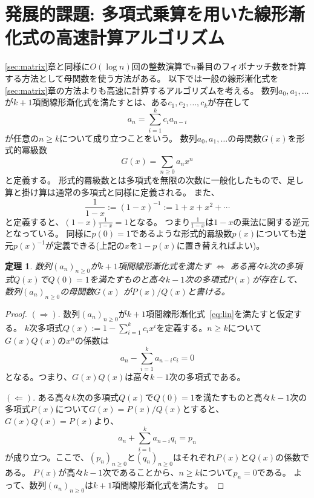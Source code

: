 \documentclass[a4paper,twoside,onecolumn,openany,article]{memoir}
\theoremstyle{plain}
\newtheorem{theorem}{定理}
\theoremstyle{remark}
\begin{document}
\section{発展的課題: 多項式乗算を用いた線形漸化式の高速計算アルゴリズム}
\ref{sec:matrix}章と同様に$O(\log n)$回の整数演算で$n$番目のフィボナッチ数を計算する方法として母関数を使う方法がある。
以下では一般の線形漸化式を\ref{sec:matrix}章の方法よりも高速に計算するアルゴリズムを考える。
数列$a_0,a_1,\dotsc$が$k+1$項間線形漸化式を満たすとは、ある$c_1,c_2,\dotsc,c_k$が存在して
\begin{equation}
a_n = \sum_{i=1}^k c_i a_{n-i}
\label{eq:lin}
\end{equation}
が任意の$n\ge k$について成り立つことをいう。
数列$a_0,a_1,\dotsc$の母関数$G(x)$を形式的冪級数
\begin{equation*}
G(x)=\sum_{n\ge 0} a_n x^n
\end{equation*}
と定義する。
形式的羃級数とは多項式を無限の次数に一般化したもので、足し算と掛け算は通常の多項式と同様に定義される。
また、
\begin{equation*}
\frac1{1-x} := (1-x)^{-1} := 1+x+x^2+\dotsb
\end{equation*}
と定義すると、$(1-x) \frac1{1-x} = 1$となる。
つまり$\frac1{1-x}$は$1-x$の乗法に関する逆元となっている。
同様に$p(0)= 1$であるような形式的羃級数$p(x)$についても逆元$p(x)^{-1}$が定義できる(上記の$x$を$1-p(x)$に置き替えればよい)。
\begin{theorem}\label{thm:lin}
数列$(a_n)_{n\ge 0}$が$k+1$項間線形漸化式を満たす $\iff$ ある高々$k$次の多項式$Q(x)$で$Q(0)=1$を満たすものと高々$k-1$次の多項式$P(x)$が存在して、数列$(a_n)_{n\ge 0}$の母関数$G(x)$
が$P(x)/Q(x)$と書ける。
\end{theorem}
\begin{proof}
$(\Rightarrow).$
数列$(a_n)_{n\ge 0}$が$k+1$項間線形漸化式~\eqref{eq:lin}を満たすと仮定する。
$k$次多項式$Q(x):=1-\sum_{i=1}^k c_i x^i$を定義する。$n\ge k$について$G(x)Q(x)$の$x^n$の係数は
\begin{equation*}
a_n - \sum_{i=1}^k a_{n-i} c_i = 0
\end{equation*}
となる。つまり、$G(x)Q(x)$は高々$k-1$次の多項式である。

$(\Leftarrow).$
ある高々$k$次の多項式$Q(x)$で$Q(0)=1$を満たすものと高々$k-1$次の多項式$P(x)$について$G(x)=P(x)/Q(x)$とすると、$G(x)Q(x)=P(x)$より、
\begin{equation*}
a_n + \sum_{i=1}^k a_{n-i} q_i = p_n
\end{equation*}
が成り立つ。ここで、$(p_n)_{n\ge 0}$と$(q_n)_{n\ge 0}$はそれぞれ$P(x)$と$Q(x)$の係数である。
$P(x)$が高々$k-1$次であることから、$n\ge k$について$p_n=0$である。
よって、数列$(a_n)_{n\ge 0}$は$k+1$項間線形漸化式を満たす。
\end{proof}
\end{document}
